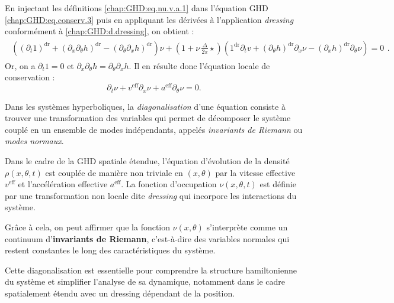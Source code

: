 \medskip

En injectant les définitions \eqref{chap:GHD:eq.nu.v.a.1} dans l'équation GHD \eqref{chap:GHD:eq.conserv.3} puis en appliquant les dérivées à l'application \emph{dressing} conformément à \eqref{chap:GHD:d.dressing}, on obtient :  
\begin{eqnarray}
	\begin{array}{c}\left ( \left(\partial_t 1 \right)^{\mathrm{dr}} + \left(\partial_x  \partial_\theta h  \right)^{\mathrm{dr}} - \left(\partial_\theta  \partial_x h  \right)^{\mathrm{dr}} \right ) \nu + \left ( 1 + \nu \,  \frac{\Delta}{2 \pi } \star  \right ) \left ( 1^{\mathrm{dr}} \partial_t v +  \left ( \partial_\theta h \right )^{\mathrm{dr}} \partial_x \nu -  \left ( \partial_x h \right )^{\mathrm{dr}} \partial_\theta \nu\right ) = 0  \end{array}. 
\end{eqnarray}
Or, on a \(\partial_t 1 = 0\) et \(\partial_x \partial_\theta h = \partial_\theta \partial_x h\). Il en résulte donc l'équation locale de conservation :  
\begin{equation}
	\partial_t \nu + v^{\mathrm{eff}}\partial_x \nu
	+ a^{\mathrm{eff}} \partial_\theta \nu = 0.
\end{equation}  

\medskip

Dans les systèmes hyperboliques, la \emph{diagonalisation} d'une équation consiste à trouver une transformation des variables qui permet de décomposer le système couplé en un ensemble de modes indépendants, appelés \emph{invariants de Riemann} ou \emph{modes normaux}. 

\medskip

Dans le cadre de la GHD spatiale étendue, l'équation d'évolution de la densité \(\rho(x,\theta,t)\) est couplée de manière non triviale en \((x,\theta)\) par la vitesse effective \(v^{\mathrm{eff}}\) et l'accélération effective \(a^{\mathrm{eff}}\). La fonction d'occupation \(\nu(x,\theta,t)\) est définie par une transformation non locale dite \emph{dressing} qui incorpore les interactions du système.

\medskip

Grâce à cela, on peut affirmer que la fonction $\nu (x , \theta)$  s’interprète comme un continuum d’{\bf invariants de Riemann}, c’est-à-dire des variables normales qui restent constantes le long des caractéristiques du système.

\medskip

Cette diagonalisation est essentielle pour comprendre la structure hamiltonienne du système et simplifier l'analyse de sa dynamique, notamment dans le cadre spatialement étendu avec un dressing dépendant de la position. 





